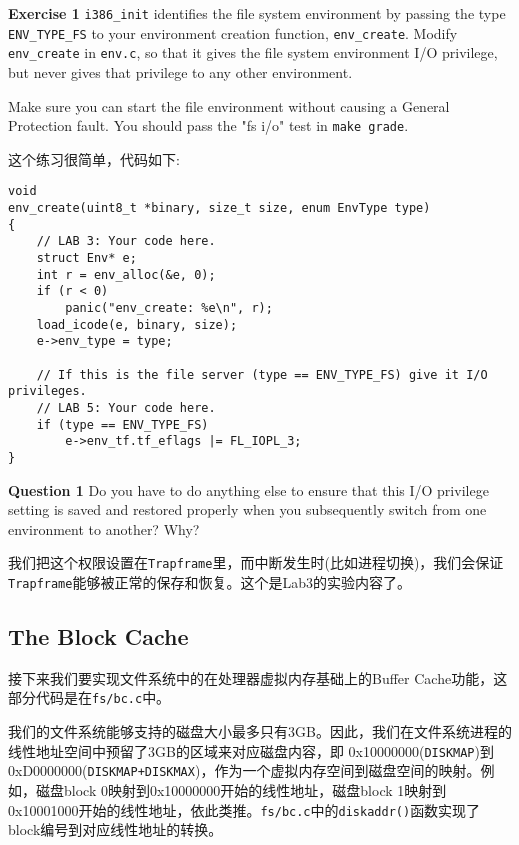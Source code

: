 \documentclass[11pt]{article}
\begin{document}
\begin{framed}
\noindent\textbf{Exercise 1} \lstinline|i386_init| identifies the file system environment by passing the type \lstinline|ENV_TYPE_FS| to your environment creation function, \lstinline|env_create|. Modify \lstinline|env_create| in \lstinline|env.c|, so that it gives the file system environment I/O privilege, but never gives that privilege to any other environment.

Make sure you can start the file environment without causing a General Protection fault. You should pass the "fs i/o" test in \lstinline|make grade|.
\end{framed}
这个练习很简单，代码如下:
\begin{lstlisting}[title=kern/env.c]
void
env_create(uint8_t *binary, size_t size, enum EnvType type)
{
	// LAB 3: Your code here.
	struct Env* e;
	int r = env_alloc(&e, 0);
	if (r < 0)
		panic("env_create: %e\n", r);
	load_icode(e, binary, size);
	e->env_type = type;

	// If this is the file server (type == ENV_TYPE_FS) give it I/O privileges.
	// LAB 5: Your code here.
	if (type == ENV_TYPE_FS)
		e->env_tf.tf_eflags |= FL_IOPL_3;
}
\end{lstlisting}

\begin{framed}
\noindent\textbf{Question 1} Do you have to do anything else to ensure that this I/O privilege setting is saved and restored properly when you subsequently switch from one environment to another? Why?
\end{framed}

我们把这个权限设置在\lstinline|Trapframe|里，而中断发生时(比如进程切换)，我们会保证\lstinline|Trapframe|能够被正常的保存和恢复。这个是Lab3的实验内容了。

\subsection{The Block Cache}
接下来我们要实现文件系统中的在处理器虚拟内存基础上的Buffer Cache功能，这部分代码是在\lstinline|fs/bc.c|中。

我们的文件系统能够支持的磁盘大小最多只有3GB。因此，我们在文件系统进程的线性地址空间中预留了3GB的区域来对应磁盘内容，即 0x10000000(\lstinline|DISKMAP|)到0xD0000000(\lstinline|DISKMAP+DISKMAX|)，作为一个虚拟内存空间到磁盘空间的映射。例如，磁盘block 0映射到0x10000000开始的线性地址，磁盘block 1映射到 0x10001000开始的线性地址，依此类推。\lstinline|fs/bc.c|中的\lstinline|diskaddr()|函数实现了block编号到对应线性地址的转换。 
\end{document}
